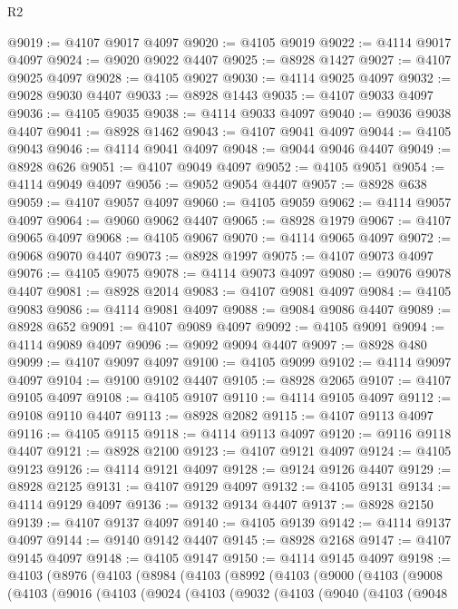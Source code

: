 \begin{lexlean}{R2}
\begin{coremodule}
@9019 := @4107 @9017 @4097
@9020 := @4105 @9019
@9022 := @4114 @9017 @4097
@9024 := @9020 @9022 @4407
@9025 := @8928 @1427
@9027 := @4107 @9025 @4097
@9028 := @4105 @9027
@9030 := @4114 @9025 @4097
@9032 := @9028 @9030 @4407
@9033 := @8928 @1443
@9035 := @4107 @9033 @4097
@9036 := @4105 @9035
@9038 := @4114 @9033 @4097
@9040 := @9036 @9038 @4407
@9041 := @8928 @1462
@9043 := @4107 @9041 @4097
@9044 := @4105 @9043
@9046 := @4114 @9041 @4097
@9048 := @9044 @9046 @4407
@9049 := @8928 @626
@9051 := @4107 @9049 @4097
@9052 := @4105 @9051
@9054 := @4114 @9049 @4097
@9056 := @9052 @9054 @4407
@9057 := @8928 @638
@9059 := @4107 @9057 @4097
@9060 := @4105 @9059
@9062 := @4114 @9057 @4097
@9064 := @9060 @9062 @4407
@9065 := @8928 @1979
@9067 := @4107 @9065 @4097
@9068 := @4105 @9067
@9070 := @4114 @9065 @4097
@9072 := @9068 @9070 @4407
@9073 := @8928 @1997
@9075 := @4107 @9073 @4097
@9076 := @4105 @9075
@9078 := @4114 @9073 @4097
@9080 := @9076 @9078 @4407
@9081 := @8928 @2014
@9083 := @4107 @9081 @4097
@9084 := @4105 @9083
@9086 := @4114 @9081 @4097
@9088 := @9084 @9086 @4407
@9089 := @8928 @652
@9091 := @4107 @9089 @4097
@9092 := @4105 @9091
@9094 := @4114 @9089 @4097
@9096 := @9092 @9094 @4407
@9097 := @8928 @480
@9099 := @4107 @9097 @4097
@9100 := @4105 @9099
@9102 := @4114 @9097 @4097
@9104 := @9100 @9102 @4407
@9105 := @8928 @2065
@9107 := @4107 @9105 @4097
@9108 := @4105 @9107
@9110 := @4114 @9105 @4097
@9112 := @9108 @9110 @4407
@9113 := @8928 @2082
@9115 := @4107 @9113 @4097
@9116 := @4105 @9115
@9118 := @4114 @9113 @4097
@9120 := @9116 @9118 @4407
@9121 := @8928 @2100
@9123 := @4107 @9121 @4097
@9124 := @4105 @9123
@9126 := @4114 @9121 @4097
@9128 := @9124 @9126 @4407
@9129 := @8928 @2125
@9131 := @4107 @9129 @4097
@9132 := @4105 @9131
@9134 := @4114 @9129 @4097
@9136 := @9132 @9134 @4407
@9137 := @8928 @2150
@9139 := @4107 @9137 @4097
@9140 := @4105 @9139
@9142 := @4114 @9137 @4097
@9144 := @9140 @9142 @4407
@9145 := @8928 @2168
@9147 := @4107 @9145 @4097
@9148 := @4105 @9147
@9150 := @4114 @9145 @4097
@9198 := @4103
    (@8976
      (@4103
        (@8984
          (@4103
            (@8992
              (@4103
                (@9000
                  (@4103
                    (@9008
                      (@4103
                        (@9016
                          (@4103
                            (@9024
                              (@4103
                                (@9032
                                  (@4103
                                    (@9040
                                      (@4103
                                        (@9048

\end{coremodule}
\end{lexlean}
